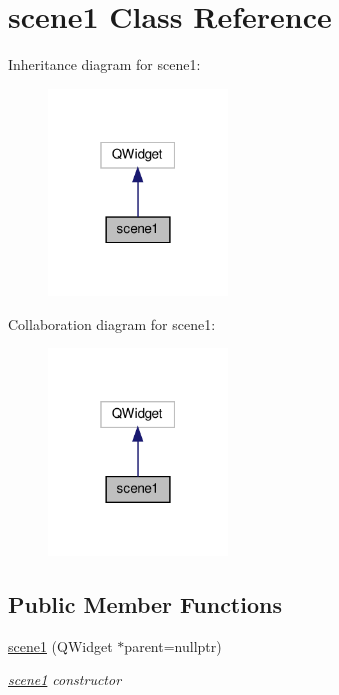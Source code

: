 \hypertarget{classscene1}{}\section{scene1 Class Reference}
\label{classscene1}


Inheritance diagram for scene1\+:
\nopagebreak
\begin{figure}[H]
\begin{center}
\leavevmode
\includegraphics[width=135pt]{classscene1__inherit__graph}
\end{center}
\end{figure}


Collaboration diagram for scene1\+:
\nopagebreak
\begin{figure}[H]
\begin{center}
\leavevmode
\includegraphics[width=135pt]{classscene1__coll__graph}
\end{center}
\end{figure}
\subsection*{Public Member Functions}
\begin{DoxyCompactItemize}
\item 
\hyperlink{classscene1_a55f27703d7a712de182d8b1d1a0c6885}{scene1} (Q\+Widget $\ast$parent=nullptr)
\begin{DoxyCompactList}\small\item\em \hyperlink{classscene1}{scene1} constructor \end{DoxyCompactList}\end{DoxyCompactItemize}


